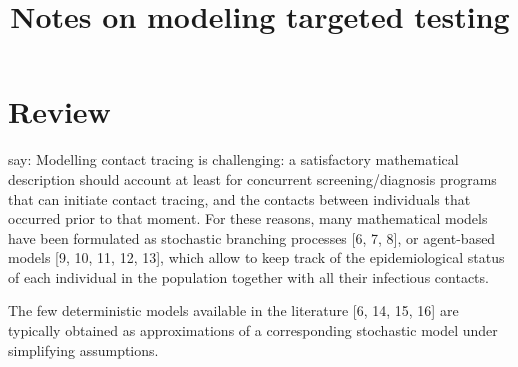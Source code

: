 \documentclass[12pt]{article}
\title{Notes on modeling targeted testing }
\theoremstyle{definition} %
\begin{document}
\maketitle

\section{Review}

\cite{scarabel2021renewal} say: 
Modelling contact tracing is challenging: a satisfactory mathematical description should account at least for concurrent screening/diagnosis programs that can initiate contact tracing, and the contacts between individuals that occurred prior to that moment. For these reasons,
many mathematical models have been formulated as stochastic branching processes [6, 7, 8], or agent-based models [9, 10, 11, 12, 13], which allow to keep
track of the epidemiological status of each individual in the population together
with all their infectious contacts.

The few deterministic models available in the literature [6, 14, 15, 16] are typically obtained as approximations of a corresponding stochastic model under simplifying
assumptions.


\end{document}
